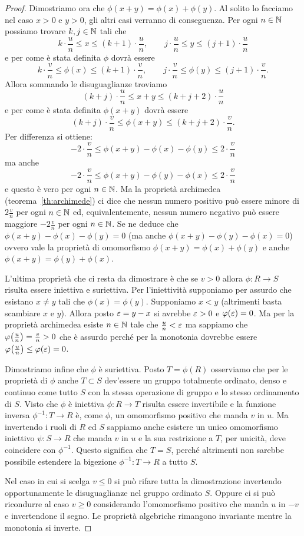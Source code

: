 \begin{proof}
Dimostriamo ora che $\phi(x+y)=\phi(x)+\phi(y)$.
Al solito lo facciamo nel caso $x>0$ e $y>0$, 
gli altri casi verranno di conseguenza.
Per ogni $n\in {\mathbb N}$ possiamo trovare $k,j\in {\mathbb N}$ tali che 
\[
  k\cdot \frac u n \le x \le (k+1)\cdot \frac u n, \qquad 
  j\cdot \frac u n \le y \le (j+1)\cdot \frac u n
\]
e per come è stata definita $\phi$ dovrà essere 
\[
  k\cdot \frac v n \le \phi(x) \le (k+1)\cdot\frac v n, \qquad  
  j\cdot \frac v n \le \phi(y) \le (j+1)\cdot\frac v n.
\]
Allora sommando le disuguaglianze troviamo 
\[
  (k+j) \cdot \frac u n \le x + y \le (k+j+2) \cdot \frac u n  
\]
e per come è stata definita $\phi(x+y)$ dovrà essere 
\[
  (k+j)\cdot \frac v n \le \phi(x+y) \le (k+j+2)\cdot \frac v n.
\]
Per differenza si ottiene:
\[
 -2\cdot \frac v n \le \phi(x+y) - \phi(x) - \phi(y) \le 2\cdot \frac v n
\]
ma anche 
\[
 -2\cdot \frac v n \le \phi(x+y) - \phi(y) - \phi(x) \le 2\cdot \frac v n
\]
e questo è vero per ogni $n\in {\mathbb N}$.
Ma la proprietà archimedea (teorema~\ref{th:archimede}) 
ci dice che nessun numero positivo 
può essere minore di $2\frac v n$ per ogni $n\in {\mathbb N}$ ed, equivalentemente,
nessun numero negativo può essere maggiore $-2\frac v n$ per ogni $n\in {\mathbb N}$.
Se ne deduce che $\phi(x+y)-\phi(x)-\phi(y)=0$ 
(ma anche $\phi(x+y) - \phi(y)-\phi(x)=0$)
ovvero vale la proprietà di omomorfismo $\phi(x+y)=\phi(x) + \phi(y)$
e anche $\phi(x+y) = \phi(y) + \phi(x)$.

L'ultima proprietà che ci resta da dimostrare è che 
se $v > 0$ allora $\phi\colon R\to S$ 
risulta essere iniettiva e suriettiva. 
Per l'iniettività supponiamo per assurdo che esistano 
$x \neq y$ tali che $\phi(x) = \phi(y)$.
Supponiamo $x<y$ (altrimenti basta scambiare $x$ e $y$).
Allora posto $\varepsilon = y - x$ si avrebbe $\varepsilon>0$ e $\varphi(\varepsilon)=0$.
Ma per la proprietà archimedea esiste $n\in {\mathbb N}$ tale che 
$\frac u n < \varepsilon$ ma sappiamo che $\varphi{\left( \frac u n \right)} = \frac v n >0$
che è assurdo perché per la monotonia dovrebbe essere 
$\varphi{\left( \frac u n \right)} \le \varphi(\varepsilon) = 0$.

Dimostriamo infine che $\phi$ è suriettiva. 
Posto $T=\phi(R)$ osserviamo che per le proprietà di $\phi$ 
anche $T\subset S$ dev'essere 
un gruppo totalmente ordinato, denso e continuo come tutto $S$
con la stessa operazione di gruppo e lo stesso ordinamento di $S$.
Visto che $\phi$ è iniettiva $\phi\colon R\to T$ 
risulta essere invertibile
e la funzione inversa $\phi^{-1}\colon T\to R$ è, come $\phi$, 
un omomorfismo positivo che manda $v$ in $u$.
Ma invertendo i ruoli di $R$ ed $S$ sappiamo anche esistere un 
unico omomorfismo iniettivo $\psi\colon S\to R$ 
che manda $v$ in $u$ e la sua 
restrizione a $T$, per unicità, deve coincidere con $\phi^{-1}$.
Questo significa che $T=S$, perché altrimenti non sarebbe possibile 
estendere la bigezione $\phi^{-1}\colon T \to R$ a tutto $S$.

Nel caso in cui si scelga $v\le 0$ si può rifare tutta la dimostrazione 
invertendo opportunamente le disuguaglianze nel gruppo ordinato $S$.
Oppure ci si può ricondurre al caso $v\ge 0$ considerando l'omomorfismo 
positivo che manda $u$ in $-v$ e invertendone il segno.
Le proprietà algebriche rimangono invariante mentre la monotonia si inverte.
\end{proof}

